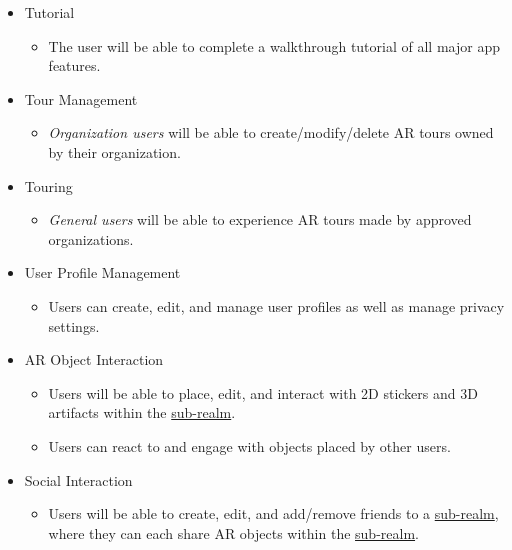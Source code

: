 \documentclass{article}
\begin{document}
\begin{itemize}
    \item Tutorial
          \begin{itemize}
              \item The user will be able to complete a walkthrough tutorial of all major app features.
          \end{itemize}

    \item Tour Management
          \begin{itemize}
              \item \textit{Organization users} will be able to create/modify/delete AR tours owned by their organization.
          \end{itemize}

    \item Touring
          \begin{itemize}
              \item \textit{General users} will be able to experience AR tours made by approved organizations.
          \end{itemize}

    \item User Profile Management
          \begin{itemize}
              \item Users can create, edit, and manage user profiles as well as manage privacy settings.
          \end{itemize}

    \item AR Object Interaction
          \begin{itemize}
              \item Users will be able to place, edit, and interact with 2D stickers and 3D artifacts within the \hyperref[def:sub_realm]{sub-realm}.
              \item Users can react to and engage with objects placed by other users.
          \end{itemize}

    \item Social Interaction
          \begin{itemize}
              \item Users will be able to create, edit, and add/remove friends to a \hyperref[def:sub_realm]{sub-realm}, where they can each share AR objects within the \hyperref[def:sub_realm]{sub-realm}.
          \end{itemize}


\end{itemize}
\end{document}
